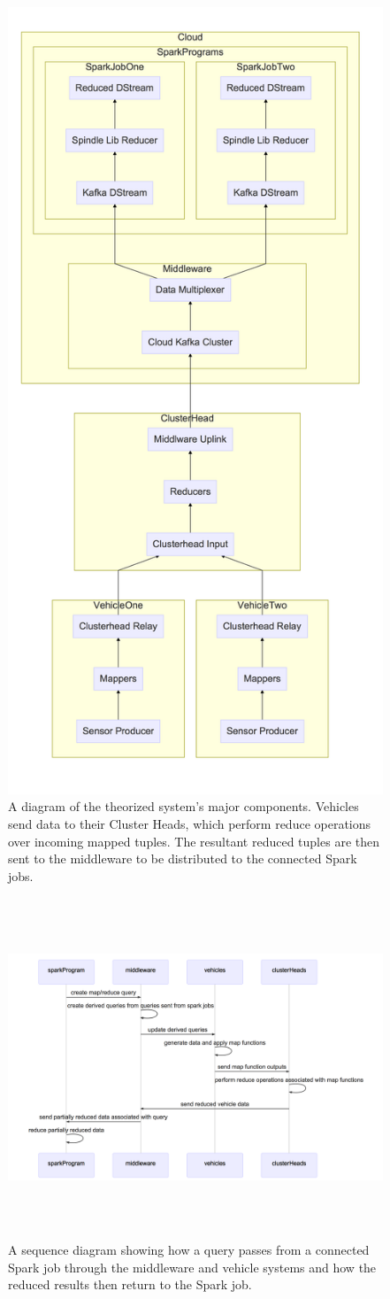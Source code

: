 \documentclass{thesis}
\begin{document}
    \begin{figure}
        \centering
        \includegraphics[width=0.5\linewidth]{binImages/theoretical-system.png}
        \caption{A diagram of the theorized system's major components. Vehicles
        send data to their Cluster Heads, which perform reduce operations over
        incoming mapped tuples. The resultant reduced tuples are then sent to
        the middleware to be distributed to the connected Spark jobs.}
        \label{fig:theoretical:component}
    \end{figure}
    \begin{figure}
        \centering
        \includegraphics[height=4in, width=6in]{binImages/theoretical-sequence.png}
        \caption{A sequence diagram showing how a query passes from a connected Spark job
        through the middleware and vehicle systems and how the reduced results then return
        to the Spark job.}
        \label{fig:theoretical:sequence}
    \end{figure}
\end{document}
